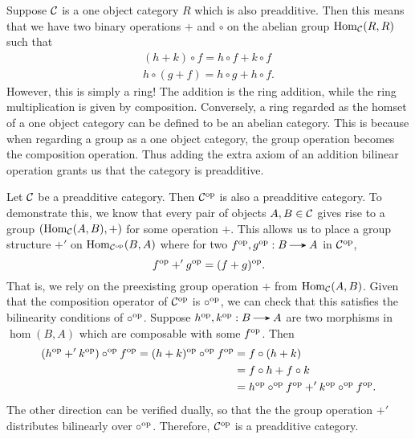 \begin{example}
    Suppose $\mathcal{C}$ is a one object category $R$ which is also preadditive. Then 
    this means that we have two binary operations $+$ and $\circ$ on the 
    abelian group $\operatorname{\mathrm{Hom}}_{\mathcal{C}}(R, R)$ 
    such that 
    \begin{align*}
        (h + k) \circ f = h \circ f + k \circ f\\
        h \circ (g + f) = h \circ g + h \circ f.
    \end{align*}
    However, this is simply a ring! The addition is the ring addition, while the 
    ring multiplication is given by composition.
    Conversely, a ring regarded as the homset of a 
    one object category can be defined to be an abelian category. This is because 
    when regarding a group as a one object category, the group operation becomes the 
    composition operation. Thus adding the extra axiom of an addition bilinear operation 
    grants us that the category is preadditive.
\end{example}


\begin{example}
    Let $\mathcal{C}$ be a preadditive category. Then 
    $\mathcal{C}^{\mathrm{op}}$ is also a preadditive category. To demonstrate this, we know that 
    every pair of objects $A, B \in \mathcal{C}$ gives rise to a group $(\operatorname{\mathrm{Hom}}_{\mathcal{C}}(A, B), +)$
    for some operation $+$. This allows us to place a group structure $+'$ on 
    $\operatorname{\mathrm{Hom}}_{\mathcal{C}^{\mathrm{op}}}(B, A)$ where for two $f\op, g\op: B \to A$ in $\mathcal{C}^{\mathrm{op}}$,
    \[
        f^{\mathrm{op}} +' g^{\mathrm{op}} = (f + g)^{\mathrm{op}}.
    \]
    That is, we rely on the preexisting group operation $+$ from  $\operatorname{\mathrm{Hom}}_{\mathcal{C}}(A, B)$. 
    Given that the composition operator of $\mathcal{C}^{\mathrm{op}}$ is $\circ^{\mathrm{op}}$, we can check that 
    this satisfies the bilinearity conditions of $\circ^{\mathrm{op}}$.
    Suppose $h\op, k\op : B \to A$ are two morphisms in $\hom(B, A)$ which 
    are composable with some $f^{\mathrm{op}}$. Then 
    \begin{align*}
        (h^{\mathrm{op}} +' k^{\mathrm{op}})\circ^{\mathrm{op}} f^{\mathrm{op}} 
        = 
        (h + k)^{\mathrm{op}} \circ ^{\mathrm{op}} f^{\mathrm{op}}
        &= 
        f \circ (h + k)\\
        &= f \circ h + f \circ k \\
        &= h^{\mathrm{op}} \circ^{\mathrm{op}} f^{\mathrm{op}} +' k^{\mathrm{op}} \circ^{\mathrm{op}} f^{\mathrm{op}}. 
    \end{align*}
    The other direction can be verified dually, so that the the group operation 
    $+'$ distributes bilinearly over $\circ^{\mathrm{op}}$. Therefore, $\mathcal{C}^{\mathrm{op}}$ is a preadditive 
    category.
\end{example}

